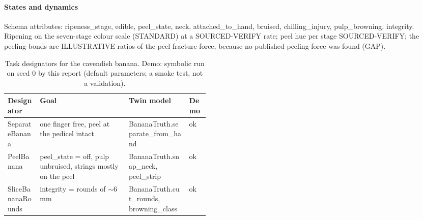 \documentclass[10.5pt,a4paper]{article}
\begin{document}
\paragraph{States and dynamics} Schema attributes: ripeness\_stage, edible, peel\_state, neck, attached\_to\_hand, bruised, chilling\_injury, pulp\_browning, integrity. Ripening on the seven-stage colour scale (STANDARD) at a SOURCED-VERIFY rate; peel hue per stage
SOURCED-VERIFY; the peeling bonds are ILLUSTRATIVE ratios of the peel fracture force, because no published peeling
force was found (GAP).\begin{table}[htbp]\centering\scriptsize\caption{Task designators for the cavendish banana. Demo: symbolic run on seed 0 by this report (default parameters; a smoke test, not a validation).}
\begin{tabularx}{\linewidth}{@{}p{0.16\linewidth}Xp{0.3\linewidth}l@{}}\toprule Designator & Goal & Twin model & Demo \\\midrule
SeparateBanana & one finger free, peel at the pedicel intact & BananaTruth.separate\_from\_hand & ok \\
PeelBanana & peel\_state = off, pulp unbruised, strings mostly on the peel & BananaTruth.snap\_neck, peel\_strip & ok \\
SliceBananaRounds & integrity = rounds of $\sim$6 mm & BananaTruth.cut\_rounds, browning\_class & ok \\\bottomrule\end{tabularx}\end{table}
\end{document}

